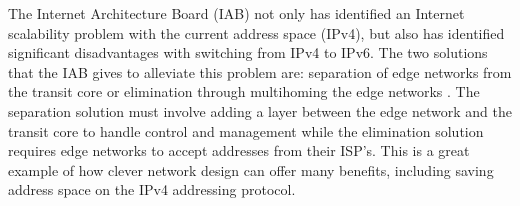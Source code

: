 \documentclass{sigcomm-alternate}
\begin{document}




The Internet Architecture Board (IAB) not only has identified an Internet scalability problem with the current address space (IPv4), but also has identified significant disadvantages with switching from IPv4 to IPv6. The two solutions that the IAB gives to alleviate this problem are: separation of edge networks from the transit core or elimination through multihoming the edge networks \cite{scalability}. The separation solution must involve adding a layer between the edge network and the transit core to handle control and management while the elimination solution requires edge networks to accept addresses from their ISP's. This is a great example of how clever network design can offer many benefits, including saving address space on the IPv4 addressing protocol.  
\end{document}
